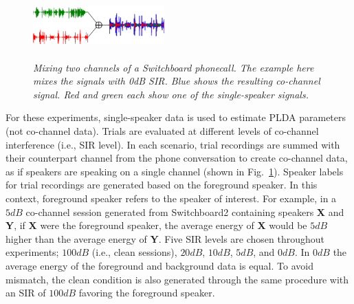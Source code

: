 \begin{figure}[t!]
	\vspace{-1mm}
	\centering
	\includegraphics[height = 1.0in, width=0.45\textwidth]{figures/swb_cch_demo-crop}
	\vspace{-1mm}
	\caption{\it \small Mixing two channels of a Switchboard phonecall. The example here mixes the signals with 0dB SIR. Blue shows the resulting co-channel signal. Red and green each show one of the single-speaker signals.}
	\label{fig:mix_swb}
	\vspace{-1mm}
\end{figure}

For these experiments, single-speaker data is used to estimate PLDA parameters (not co-channel data). 
Trials are evaluated at different levels of co-channel interference (i.e., SIR level). 
In each scenario, trial recordings are summed with their counterpart channel from the phone conversation to create co-channel data, as if speakers are speaking on a single channel (shown in Fig.~\ref{fig:mix_swb}). 
Speaker labels for trial recordings are generated based on the foreground speaker. 
In this context, foreground speaker refers to the speaker of interest. 
For example, in a $5dB$ co-channel session generated from Switchboard2 containing speakers {\bf X} and {\bf Y}, if {\bf X} were the foreground speaker, the average energy of {\bf X} would be $5dB$ higher than the average energy of {\bf Y}. 
Five SIR levels are chosen throughout experiments; $100dB$ (i.e., clean sessions), $20dB$, $10dB$, $5dB$, and $0dB$. 
In $0dB$ the average energy of the foreground and background data is equal. 
To avoid mismatch, the clean condition is also generated through the same procedure with an SIR of $100dB$ favoring the foreground speaker. 

